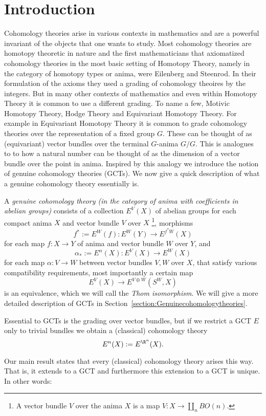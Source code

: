 \section{Introduction}

Cohomology theories arise in various contexts in mathematics and are a powerful invariant of the objects that one wants to study.
Most cohomology theories are homotopy theoretic in nature and the first mathematicians that axiomatized cohomology theories in the most
basic setting of Homotopy Theory, namely in the category of homotopy types or anima, were Eilenberg and Steenrod.
In their formulation of the axioms they used a grading of cohomology theoires by the integers.
But in many other contexts of mathematics and even within Homotopy Theory it is common to use a different grading.
To name a few, Motivic Homotopy Theory, Hodge Theory and Equivariant Homotopy Theory. 
For example in Equivariant Homotopy Theory it is common to 
grade cohomology theories over the representation of a fixed group $G$.
These can be thought of as (equivariant) vector bundles over the 
terminal $G$-anima $G/G$.
This is analogues to to how a natural number can be thought of as the dimension of a vector bundle over the point in anima.
Inspired by this analogy we introduce the notion of genuine cohomology theories (GCTs).
We now give a quick description of what a genuine cohomology theory essentially is.

A \emph{genuine cohomology theory (in the category of anima with coefficients in abelian groups)} 
consists of a collection $E^V(X)$ of abelian groups for each compact anima $X$ and vector bundle $V$ over $X$
\footnote{A vector bundle $V$ over the anima $X$ is a map $V \colon X \to \coprod_n BO(n)$.},
morphisms 
\[f^* := E^W(f) \colon E^W(Y) \to E^{f^*W}(X)\] for each map $f \colon X \to Y$ of anima and vector bundle $W$ over 
$Y$,
and 
\[\alpha_* := E^\alpha(X) \colon E^V(X) \to E^W(X)\] for each map $\alpha \colon V \to W$ between vector bundles $V,W$ over $X$, 
that satisfy various compatibility requirements, most importantly 
a certain map 
\[
E^V(X) \to E^{V \oplus W}(S^W,X)    
\]
is an equivalence, which we will call the \emph{Thom isomorphism}.
We will give a more detailed description of GCTs in Section~\ref{section:Genuinecohomologytheories}.

Essential to GCTs is the grading over vector bundles, but if we restrict a GCT $E$ only to trivial bundles 
we obtain a (classical) cohomology theory
\[
  E^n(X) := E^{\R^n}(X).  
\]

Our main result states that every (classical) cohomology theory arises this way.
That is, it extends to a GCT and furthermore this extension to a GCT is unique.
In other words:

